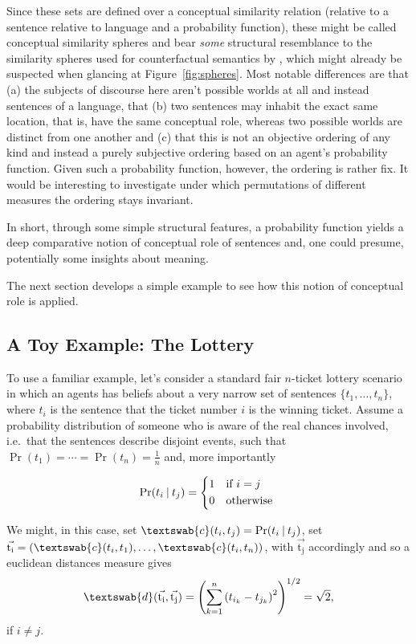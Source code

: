 \documentclass[11pt, a4paper]{scrartcl}
\renewcommand{\i}[1]{\emph{#1}}
\renewcommand{\v}[1]{\vec{\mathrm{#1}}}
\newcommand{\m}[1]{\textswab{#1}}
\newcommand{\given}[1][]{\:#1\vert\:}
\begin{document}
Since these sets are defined over a conceptual similarity relation (relative to a sentence relative to language and a probability function), these might be called conceptual similarity spheres and bear \i{some} structural resemblance to the similarity spheres used for counterfactual semantics by \textcite{Lewis1973-LEWC-2}, which might already be suspected when glancing at Figure~\ref{fig:spheres}. Most notable differences are that (a) the subjects of discourse here aren't possible worlds at all and instead sentences of a language, that (b) two sentences may inhabit the exact same location, that is, have the same conceptual role, whereas two possible worlds are distinct from one another and (c) that this is not an objective ordering of any kind and instead a purely subjective ordering based on an agent's probability function. Given such a probability function, however, the ordering is rather fix. It would be interesting to investigate under which permutations of different measures the ordering stays invariant.

In short, through some simple structural features, a probability function yields a deep comparative notion of conceptual role of sentences and, one could presume, potentially some insights about meaning.

The next section develops a simple example to see how this notion of conceptual role is applied.

\subsection{A Toy Example: The Lottery}

To use a familiar example, let's consider a standard fair $n$-ticket lottery scenario in which an agents has beliefs about a very narrow set of sentences $\{ t_1, \dots, t_n\}$, where $t_i$ is the sentence that the ticket number $i$ is the winning ticket. Assume a probability distribution of someone who is aware of the real chances involved, i.e.\ that the sentences describe disjoint events, such that $\Pr(t_1) = \cdots = \Pr(t_n) = \frac{1}{n}$ and, more importantly

\[
    \Pr(t_i \given t_j)  =
    \begin{cases*}
        1 & if $i = j$ \\
        0        & otherwise
    \end{cases*}
\]

We might, in this case, set $\m{c}(t_i, t_j) = \Pr(t_i \given t_j)$, set $\v{t_i} = (\m{c}(t_i,t_1),\ldots,\m{c}(t_i,t_n))$, with $\v{t_j}$ accordingly and so a euclidean distances measure gives 
\[
    \m{d}(\v{t_i},\v{t_j}) = {\left( \sum_{k=1}^n {(t_{i_k}-t_{j_k})}^2 \right)}^{1/2} = \sqrt{2},  
\]
if $i \not = j$.
\end{document}
